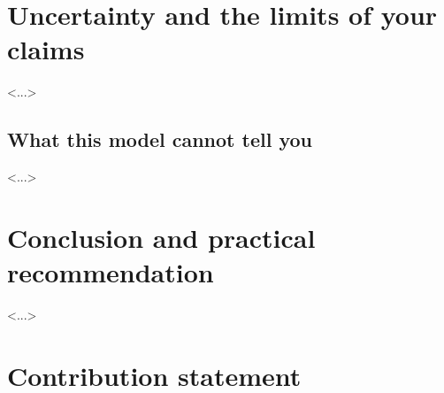 \documentclass[11pt,a4paper]{article}
\begin{document}
\section{Uncertainty and the limits of your claims}

<...>

\subsection{What this model cannot tell you}

<...>

\section{Conclusion and practical recommendation}
%

<...>

\section{Contribution statement}
\end{document}
